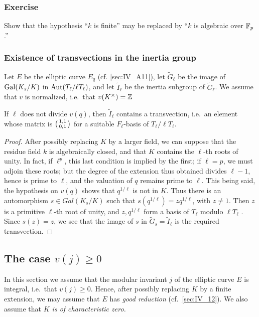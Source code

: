 \begin{subappendices}
\subsubsection*{Exercise}
Show that the hypothesis ``$k$ is finite'' may be replaced by ``$k$ is algebraic
over $\mathbb{F}_p$.''

\subsubsection{Existence of transvections in the inertia group}
\label{sec:IV_A15}


Let $E$ be the elliptic curve $E_q$ (cf. \ref{sec:IV_A11}), let
$\tilde{G}_\ell$ be the image of $\operatorname{Gal}({K}_s/K)$ in $\operatorname{Aut}(T_\ell / \ell
T_\ell)$, and let $\tilde{I}_\ell$ be the inertia subgroup of $\tilde{G}_\ell$.
We assume that $v$ is normalized, i.e.\ that $v(K^\times) = \mathbb{Z}$
\dpage
\begin{prop}
If $\ell$ does not divide $v(q)$, then $\tilde{I}_\ell$ contains a transvection,
i.e.\ an element whose matrix is
$\begin{psmallmatrix} 1, 1 \\ 0, 1 \end{psmallmatrix}$
for a suitable $F_\ell$-basis of $T_\ell / \ell T_\ell$.
\end{prop}

\begin{proof}
After possibly replacing $K$ by a larger field, we can suppose
that the residue field $k$ is algebraically closed, and that $K$ contains
the $\ell$-th roots of unity. In fact, if $\ell ^ p$, this last condition is
implied by the first; if $\ell = p$, we must adjoin these roots; but the degree
of the extension thus obtained divides $\ell-1$, hence is prime to
$\ell$, and the valuation of $q$ remains prime to $\ell$. This being said, the
hypothesis on $v(q)$ shows that $q^{1/\ell}$ is not in $K$. Thus there is an
automorphism $s \in Gal(K_s/K)$ such that $s(q^{1/\ell}) = zq^{1/\ell}$, with $z
\neq 1$. Then $z$ is a
primitive $\ell$-th root of unity, and $z,q^{1/\ell}$ form
a basis of $T_\ell$ modulo $\ell T_\ell$ . Since $s(z) = z$, we see that the
image
of $s$ in $\tilde{G}_s = \tilde{I}_\ell$ is the required transvection.
\end{proof}

\subsection{The case \texorpdfstring{$v(j) \ge 0$}{v(j) ≥ 0}}
\label{sec:IV_A2}
In this section we assume that the modular invariant $j$ of the elliptic curve
$E$ is integral, i.e.\ that $v(j) \ge 0$. Hence, after possibly replacing $K$
by a finite extension, we may assume that $E$ has \emph{good reduction} (cf.\
\ref{sec:IV_12}). We also assume that \emph{$K$ is of characteristic zero.}


\end{subappendices}

